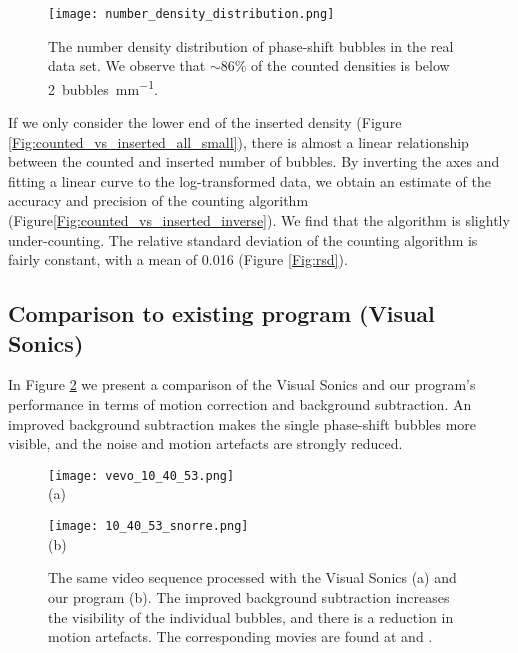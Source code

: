 \begin{figure}[h]
	\centering
	\texttt{[image: number\_density\_distribution.png]}
	\caption{The number density distribution of phase-shift bubbles in the real data set. We observe that $\sim 86\%$ of the counted densities is below \SI{2}{bubbles\per\milli\meter}.}
	\label{Fig:number density distribution}
\end{figure} 


If we only consider the lower end of the inserted density (Figure \ref{Fig:counted_vs_inserted_all_small}), there is almost a linear relationship between the counted and inserted number of bubbles. By inverting the axes and fitting a linear curve to the log-transformed data, we obtain an estimate of the accuracy and precision of the counting algorithm (Figure\ref{Fig:counted_vs_inserted_inverse}). We find that the algorithm is slightly under-counting. The relative standard deviation of the counting algorithm is fairly constant, with a mean of 0.016 (Figure \ref{Fig:rsd}).

\subsection{Comparison to existing program (Visual Sonics)}
In Figure \ref{Fig:compare VisualSonics} we present a comparison of the Visual Sonics and our program's performance in terms of motion correction and background subtraction. An improved background subtraction makes the single phase-shift bubbles more visible, and the noise and motion artefacts are strongly reduced.

\begin{figure}[h]
	\centering
	\begin{minipage}[b]{0.42\textwidth}
		\centering
		\texttt{[image: vevo\_10\_40\_53.png]}\\
		(a)
	\end{minipage}%
	\begin{minipage}[b]{0.35\textwidth}
		\centering
		\texttt{[image: 10\_40\_53\_snorre.png]}\\
		(b)
	\end{minipage}%
	 \cprotect\caption{The same video sequence processed with the Visual Sonics (a) and our program (b). The improved background subtraction increases the visibility of the individual bubbles, and there is a reduction in motion artefacts. The corresponding movies are found at  and .}
	\label{Fig:compare VisualSonics}
\end{figure}

